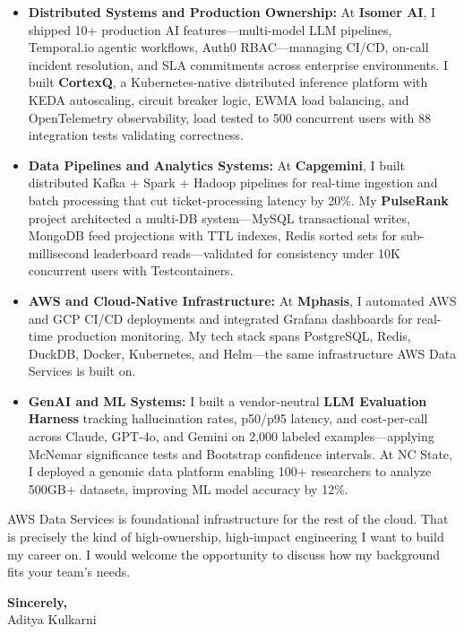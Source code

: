 \documentclass[11pt,letterpaper]{article}
\begin{document}
\begin{itemize}[leftmargin=*, itemsep=3pt, label={\color{AmazonOrange}\faAngleRight}]
    \item \textbf{Distributed Systems and Production Ownership:} At \textbf{Isomer AI}, I shipped 10+ production AI features---multi-model LLM pipelines, Temporal.io agentic workflows, Auth0 RBAC---managing CI/CD, on-call incident resolution, and SLA commitments across enterprise environments. I built \textbf{CortexQ}, a Kubernetes-native distributed inference platform with KEDA autoscaling, circuit breaker logic, EWMA load balancing, and OpenTelemetry observability, load tested to 500 concurrent users with 88 integration tests validating correctness.

    \item \textbf{Data Pipelines and Analytics Systems:} At \textbf{Capgemini}, I built distributed Kafka + Spark + Hadoop pipelines for real-time ingestion and batch processing that cut ticket-processing latency by 20\%. My \textbf{PulseRank} project architected a multi-DB system---MySQL transactional writes, MongoDB feed projections with TTL indexes, Redis sorted sets for sub-millisecond leaderboard reads---validated for consistency under 10K concurrent users with Testcontainers.

    \item \textbf{AWS and Cloud-Native Infrastructure:} At \textbf{Mphasis}, I automated AWS and GCP CI/CD deployments and integrated Grafana dashboards for real-time production monitoring. My tech stack spans PostgreSQL, Redis, DuckDB, Docker, Kubernetes, and Helm---the same infrastructure AWS Data Services is built on.

    \item \textbf{GenAI and ML Systems:} I built a vendor-neutral \textbf{LLM Evaluation Harness} tracking hallucination rates, p50/p95 latency, and cost-per-call across Claude, GPT-4o, and Gemini on 2,000 labeled examples---applying McNemar significance tests and Bootstrap confidence intervals. At NC State, I deployed a genomic data platform enabling 100+ researchers to analyze 500GB+ datasets, improving ML model accuracy by 12\%.
\end{itemize}

\vspace{6pt}

AWS Data Services is foundational infrastructure for the rest of the cloud. That is precisely the kind of high-ownership, high-impact engineering I want to build my career on. I would welcome the opportunity to discuss how my background fits your team's needs.

\vspace{12pt}

\textbf{Sincerely,}\\[8pt]
Aditya Kulkarni
\end{document}

